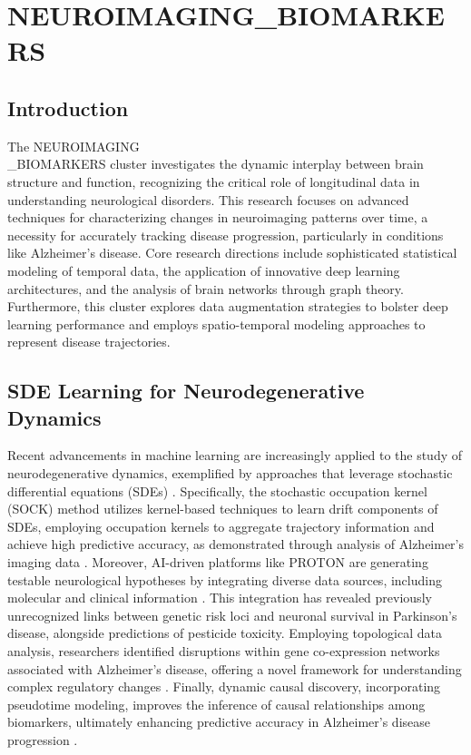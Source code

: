 \documentclass[11pt,a4paper]{article}
\begin{document}
\section{NEUROIMAGING\_BIOMARKERS}
\subsection*{Introduction}
The NEUROIMAGING\\\_BIOMARKERS cluster investigates the dynamic interplay between brain structure and function, recognizing the critical role of longitudinal data in understanding neurological disorders. This research focuses on advanced techniques for characterizing changes in neuroimaging patterns over time, a necessity for accurately tracking disease progression, particularly in conditions like Alzheimer’s disease. Core research directions include sophisticated statistical modeling of temporal data, the application of innovative deep learning architectures, and the analysis of brain networks through graph theory. Furthermore, this cluster explores data augmentation strategies to bolster deep learning performance and employs spatio-temporal modeling approaches to represent disease trajectories.

\subsection{SDE Learning for Neurodegenerative Dynamics}
Recent advancements in machine learning are increasingly applied to the study of neurodegenerative dynamics, exemplified by approaches that leverage stochastic differential equations (SDEs) \cite{arxiv250511622}.  Specifically, the stochastic occupation kernel (SOCK) method utilizes kernel-based techniques to learn drift components of SDEs, employing occupation kernels to aggregate trajectory information and achieve high predictive accuracy, as demonstrated through analysis of Alzheimer's imaging data \cite{arxiv250511622}.  Moreover, AI-driven platforms like PROTON are generating testable neurological hypotheses by integrating diverse data sources, including molecular and clinical information \cite{arxiv251213724}.  This integration has revealed previously unrecognized links between genetic risk loci and neuronal survival in Parkinson’s disease, alongside predictions of pesticide toxicity.  Employing topological data analysis, researchers identified disruptions within gene co-expression networks associated with Alzheimer’s disease, offering a novel framework for understanding complex regulatory changes \cite{arxiv251118238}.  Finally, dynamic causal discovery, incorporating pseudotime modeling, improves the inference of causal relationships among biomarkers, ultimately enhancing predictive accuracy in Alzheimer’s disease progression \cite{arxiv251104619}.
\end{document}
